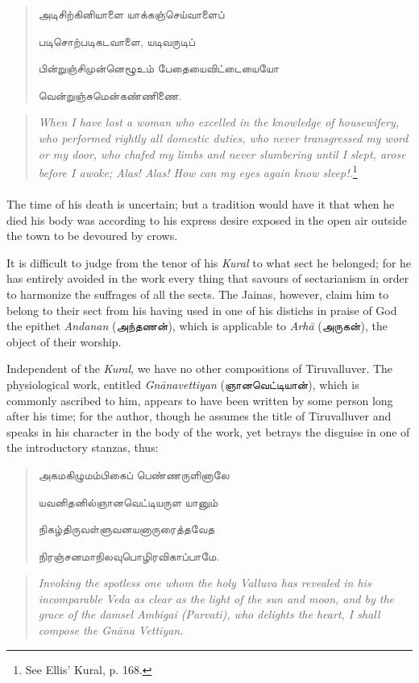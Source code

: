 \documentclass{article}
\newcommand{\TamilText}[1]{\texttamil{#1}}
\newcommand{\tam}[1]{\TamilText{#1}}
\begin{document}
\begin{quotation}\small
\tam{அடிசிற்கினியாளை யாக்கஞ்செய்வாளைப்‌}

\tam{படிசொற்படிகடவாளை}, \tam{யடிவருடிப்‌}

\tam{பின்றுஞ்சிமுன்னெழூஉம்‌ பேதையைவிட்டையையோ}

\tam{வென்றுஞ்சுமென்கண்ணிணை}.
\end{quotation}
\begin{quotation}\small
\emph{When I have lost a woman who excelled in the knowledge of housewifery, who performed rightly all domestic duties, who never transgressed my word or my door, who chafed my limbs and never slumbering until I slept, arose before I awoke; Alas! Alas! How can my eyes again know sleep!.}\footnote{See Ellis' Kural, p. 168.}
\end{quotation}
\paragraph{}
The time of his death is uncertain; but a tradition would have it that when he died his body was according to his express desire exposed in the open air outside the town to be devoured by crows.

It is difficult to judge from the tenor of his \emph{Kural} to what sect he belonged; for he has entirely avoided in the work every thing that savours of sectarianism in order to harmonize the suffrages of all the sects. The Jainas, however, claim him to belong to their sect from his having used in one of his distichs in praise of God the epithet \emph{Andanan} (\tam{அந்தணன்}), which is applicable to \emph{Arh\={a}} (\tam{அருகன்}), the object of their worship.

Independent of the \emph{Kural}, we have no other compositions of Tiruvalluver. The physiological work, entitled \emph{Gn\={a}navettiyan} (\tam{ஞானவெட்டியான்}), which is commonly ascribed to him, appears to have been written by some person long after his time; for the author, though he assumes the title of Tiruvalluver and speaks in his character in the body of the work, yet betrays the disguise in one of the introductory stanzas, thus:
\begin{quotation}\small
\tam{அகமகிழுமம்பிகைப்‌ பெண்ணருளினாலே}

\tam{யவனிதனில்‌ஞானவெட்டியருள யானும்‌}

\tam{நிகழ்திருவள்ளுவனயனாருரைத்தவேத}

\tam{நிரஞ்சனமாநிலவுபொழிரவிகாப்பாமே}.
\end{quotation}
\begin{quotation}\small
\emph{Invoking the spotless one whom the holy Valluva has revealed in his incomparable Veda as clear as the light of the sun and moon, and by the grace of the damsel Ambigai (Parvati), who delights the heart, I shall compose the Gn\={a}na Vettiyan.}
\end{quotation}
\end{document}

